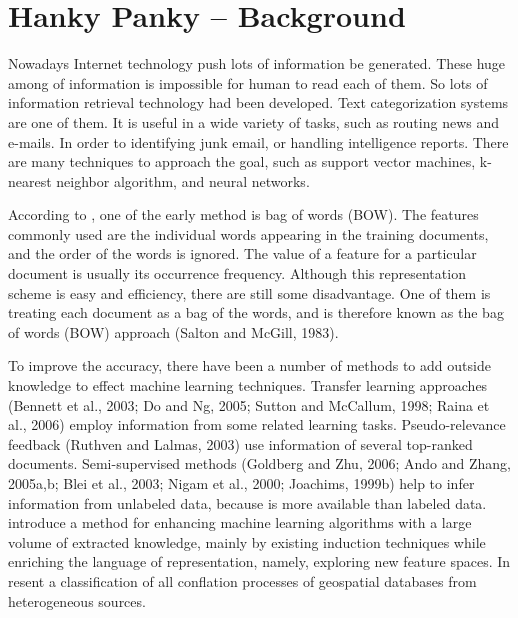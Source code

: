 \documentclass[a4paper]{article} %
\begin{document}
	\section*{Hanky Panky -- Background}
	\label{task1}
	
	Nowadays Internet technology push lots of information be generated. These huge among of information is impossible for human to read each of them. So lots of information retrieval technology had been developed. Text categorization systems are one of them. It is useful in a wide variety of tasks, such as routing news and e-mails. In order to identifying junk email, or handling intelligence reports. There are many techniques to approach the goal, such as support vector machines, k-nearest neighbor algorithm, and neural networks.
	
	According to \cite{Gabrilovich:2007:HEH:1314498.1314573}, one of the early method is bag of words (BOW). The features commonly used are the individual words appearing in the training documents, and the order of the words is ignored. The value of a feature for a particular document is usually its occurrence frequency. Although this representation scheme is easy and efficiency,  there are still some disadvantage. One of them is treating each document as a bag of the words, and is therefore known as the bag of words (BOW) approach (Salton and McGill, 1983).
	
	To improve the accuracy, there have been a number of methods to add outside knowledge to effect machine learning techniques. Transfer learning approaches (Bennett et al., 2003; Do and Ng, 2005; Sutton and McCallum, 1998; Raina et al., 2006) employ information from some related learning tasks. Pseudo-relevance feedback (Ruthven and Lalmas, 2003) use information of several top-ranked documents. Semi-supervised methods (Goldberg and Zhu, 2006; Ando and Zhang, 2005a,b; Blei et al., 2003; Nigam et al., 2000; Joachims, 1999b) help to infer information from unlabeled data, because is more available than labeled data. \cite{Gabrilovich:2007:HEH:1314498.1314573} introduce a method for enhancing machine learning algorithms with a large volume of extracted knowledge, mainly by existing induction techniques while enriching the language of representation, namely, exploring new feature spaces. In \cite{ISI:000295620300006} resent a classification of all conflation processes of geospatial databases from heterogeneous sources.
	
	
	
\end{document}
